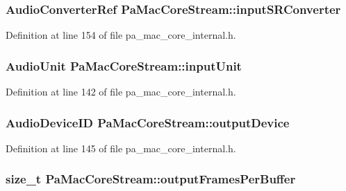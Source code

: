 \subsubsection[{\texorpdfstring{input\+S\+R\+Converter}{inputSRConverter}}]{\setlength{\rightskip}{0pt plus 5cm}Audio\+Converter\+Ref Pa\+Mac\+Core\+Stream\+::input\+S\+R\+Converter}\hypertarget{struct_pa_mac_core_stream_ab3d6f024b40670367b5bbbe1444cba92}{}\label{struct_pa_mac_core_stream_ab3d6f024b40670367b5bbbe1444cba92}


Definition at line 154 of file pa\+\_\+mac\+\_\+core\+\_\+internal.\+h.

\subsubsection[{\texorpdfstring{input\+Unit}{inputUnit}}]{\setlength{\rightskip}{0pt plus 5cm}Audio\+Unit Pa\+Mac\+Core\+Stream\+::input\+Unit}\hypertarget{struct_pa_mac_core_stream_a18489f920abd98c28ec23a08129a2a94}{}\label{struct_pa_mac_core_stream_a18489f920abd98c28ec23a08129a2a94}


Definition at line 142 of file pa\+\_\+mac\+\_\+core\+\_\+internal.\+h.

\subsubsection[{\texorpdfstring{output\+Device}{outputDevice}}]{\setlength{\rightskip}{0pt plus 5cm}Audio\+Device\+ID Pa\+Mac\+Core\+Stream\+::output\+Device}\hypertarget{struct_pa_mac_core_stream_ae982506be4fb075f57798b322893c477}{}\label{struct_pa_mac_core_stream_ae982506be4fb075f57798b322893c477}


Definition at line 145 of file pa\+\_\+mac\+\_\+core\+\_\+internal.\+h.

\subsubsection[{\texorpdfstring{output\+Frames\+Per\+Buffer}{outputFramesPerBuffer}}]{\setlength{\rightskip}{0pt plus 5cm}size\+\_\+t Pa\+Mac\+Core\+Stream\+::output\+Frames\+Per\+Buffer}\hypertarget{struct_pa_mac_core_stream_a6ba0534d56d18552f4dd23b5922b6caa}{}\label{struct_pa_mac_core_stream_a6ba0534d56d18552f4dd23b5922b6caa}


